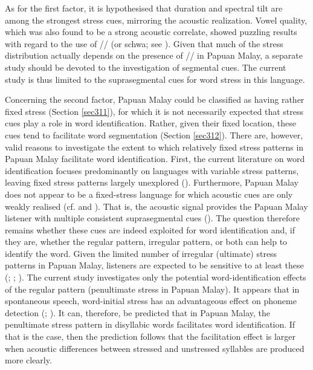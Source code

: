 As for the first factor, it is hypothesised that duration and spectral tilt are among the strongest stress cues, mirroring the acoustic realization. Vowel quality, which was also found to be a strong acoustic correlate, showed puzzling results with regard to the use of // (or schwa; see ). Given that much of the stress distribution actually depends on the presence of // in Papuan Malay, a separate study should be devoted to the investigation of segmental cues. The current study is thus limited to the suprasegmental cues for word stress in this language.

Concerning the second factor, Papuan Malay could be classified as having rather fixed stress (Section \ref{sec311}), for which it is not necessarily expected that stress cues play a role in word identification. Rather, given their fixed location, these cues tend to facilitate word segmentation (Section \ref{sec312}). There are, however, valid reasons to investigate the extent to which relatively fixed stress patterns in Papuan Malay facilitate word identification. First, the current literature on word identification focuses predominantly on languages with variable stress patterns, leaving fixed stress patterns largely unexplored (\citealt[282--283]{cutler_lexical_2005}). Furthermore, Papuan Malay does not appear to be a fixed-stress language for which acoustic cues are only weakly realised (cf.  and \citealt{dogil_phonetic_1999}). That is, the acoustic signal provides the Papuan Malay listener with multiple consistent suprasegmental cues (). The question therefore remains whether these cues are indeed exploited for word identification and, if they are, whether the regular pattern, irregular pattern, or both can help to identify the word. Given the limited number of irregular (ultimate) stress patterns in Papuan Malay, listeners are expected to be sensitive to at least these (\citealt{domahs_stress_2012}; \citealt{domahs_processing_2013}; \citealt{sulpizio_italians_2012}). The current study investigates only the potential word-identification effects of the regular pattern (penultimate stress in Papuan Malay). It appears that in spontaneous speech, word-initial stress has an advantageous effect on phoneme detection (\citealt{mehta_detection_1988}; \citealt{mcallister_processing_1991}). It can, therefore, be predicted that in Papuan Malay, the penultimate stress pattern in disyllabic words facilitates word identification. If that is the case, then the prediction follows that the facilitation effect is larger when acoustic differences between stressed and unstressed syllables are produced more clearly.

